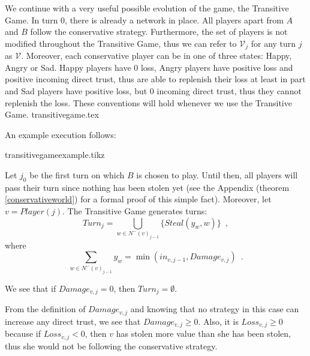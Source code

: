   We continue with a very useful possible evolution of the game, the Transitive Game. In turn 0, there is already a network
  in place. All players apart from $A$ and $B$ follow the conservative strategy. Furthermore, the set of players is not
  modified throughout the Transitive Game, thus we can refer to $\mathcal{V}_j$ for any turn $j$ as $\mathcal{V}$.
  Moreover, each conservative player can be in one of three states: Happy, Angry or Sad. Happy players have 0 loss, Angry
  players have positive loss and positive incoming direct trust, thus are able to replenish their loss at least in part and
  Sad players have positive loss, but 0 incoming direct trust, thus they cannot replenish the loss. These conventions will
  hold whenever we use the Transitive Game.
  {transitivegame.tex}

  An example execution follows:

  {transitivegameexample.tikz}

  Let $j_0$ be the first turn on which $B$ is chosen to play. Until then, all players will pass their turn since nothing
  has been stolen yet (see the Appendix (theorem \ref{conservativeworld}) for a formal proof of this simple fact).
  Moreover, let $v = Player(j)$.
  The Transitive Game generates turns:
  \begin{equation}
     Turn_j = \bigcup\limits_{w \in N^{-}\left(v\right)_{j-1}}\{Steal\left(y_w,w\right)\} \enspace,
  \end{equation}
  where
  \begin{equation*}
     \sum\limits_{w \in N^{-}\left(v\right)_{j-1}}y_w = \min\left(in_{v, j-1}, Damage_{v, j}\right) \enspace.
  \end{equation*}
 
  We see that if $Damage_{v, j} = 0$, then $Turn_j = \emptyset$.

  From the definition of $Damage_{v,j}$ and knowing that no strategy in this case can increase any direct trust, we see
  that $Damage_{v,j} \geq 0$. Also, it is $Loss_{v,j} \geq 0$ because if $Loss_{v,j} < 0$, then $v$ has
  stolen more value than she has been stolen, thus she would not be following the conservative strategy.
